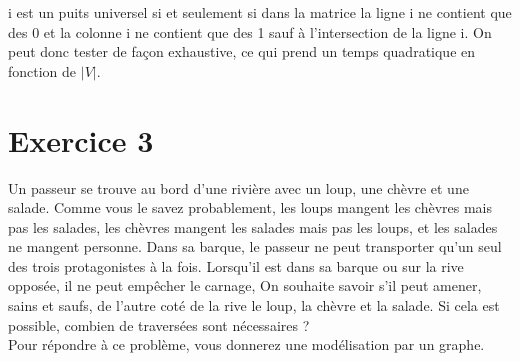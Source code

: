 \documentclass[10pt,a4paper]{article}
\begin{document}
\begin{tcolorbox}
 i est un puits universel si et seulement si dans la matrice la ligne i ne contient que
des 0 et la colonne i ne contient que des 1 sauf à l’intersection de la ligne i. On peut donc tester de façon exhaustive, ce qui prend un temps quadratique en fonction de $|V|$.
\end{tcolorbox}

\section*{Exercice 3}
Un passeur se trouve au bord d'une rivière avec un loup, une chèvre et une salade. Comme vous le savez probablement, les loups mangent les chèvres mais pas les salades, les chèvres mangent les salades mais pas les loups, et les salades ne mangent personne. Dans sa barque, le passeur ne peut transporter qu'un seul des trois protagonistes à la fois. Lorsqu'il est dans sa barque ou sur la rive opposée, il ne peut empêcher le carnage, On souhaite savoir s'il peut amener, sains et saufs, de l'autre coté de la rive le loup, la chèvre et la salade.
Si cela est possible, combien de traversées sont nécessaires ?\\
Pour répondre à ce problème, vous donnerez une modélisation par un graphe.
\end{document}
